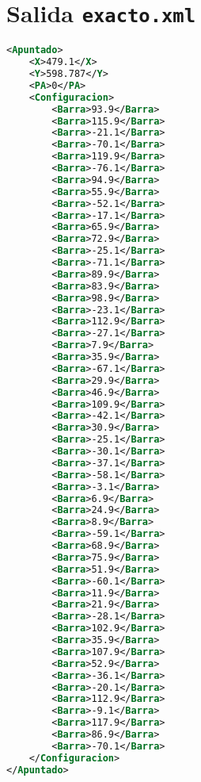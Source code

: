 \section{Salida \texttt{exacto.xml}} \label{app:exacto.xml}

\begin{lstlisting}[language=XML, basicstyle=\ttfamily\footnotesize]
<Apuntado>
	<X>479.1</X>
	<Y>598.787</Y>
	<PA>0</PA>
	<Configuracion>
		<Barra>93.9</Barra>
		<Barra>115.9</Barra>
		<Barra>-21.1</Barra>
		<Barra>-70.1</Barra>
		<Barra>119.9</Barra>
		<Barra>-76.1</Barra>
		<Barra>94.9</Barra>
		<Barra>55.9</Barra>
		<Barra>-52.1</Barra>
		<Barra>-17.1</Barra>
		<Barra>65.9</Barra>
		<Barra>72.9</Barra>
		<Barra>-25.1</Barra>
		<Barra>-71.1</Barra>
		<Barra>89.9</Barra>
		<Barra>83.9</Barra>
		<Barra>98.9</Barra>
		<Barra>-23.1</Barra>
		<Barra>112.9</Barra>
		<Barra>-27.1</Barra>
		<Barra>7.9</Barra>
		<Barra>35.9</Barra>
		<Barra>-67.1</Barra>
		<Barra>29.9</Barra>
		<Barra>46.9</Barra>
		<Barra>109.9</Barra>
		<Barra>-42.1</Barra>
		<Barra>30.9</Barra>
		<Barra>-25.1</Barra>
		<Barra>-30.1</Barra>
		<Barra>-37.1</Barra>
		<Barra>-58.1</Barra>
		<Barra>-3.1</Barra>
		<Barra>6.9</Barra>
		<Barra>24.9</Barra>
		<Barra>8.9</Barra>
		<Barra>-59.1</Barra>
		<Barra>68.9</Barra>
		<Barra>75.9</Barra>
		<Barra>51.9</Barra>
		<Barra>-60.1</Barra>
		<Barra>11.9</Barra>
		<Barra>21.9</Barra>
		<Barra>-28.1</Barra>
		<Barra>102.9</Barra>
		<Barra>35.9</Barra>
		<Barra>107.9</Barra>
		<Barra>52.9</Barra>
		<Barra>-36.1</Barra>
		<Barra>-20.1</Barra>
		<Barra>112.9</Barra>
		<Barra>-9.1</Barra>
		<Barra>117.9</Barra>
		<Barra>86.9</Barra>
		<Barra>-70.1</Barra>
	</Configuracion>
</Apuntado>
\end{lstlisting}

